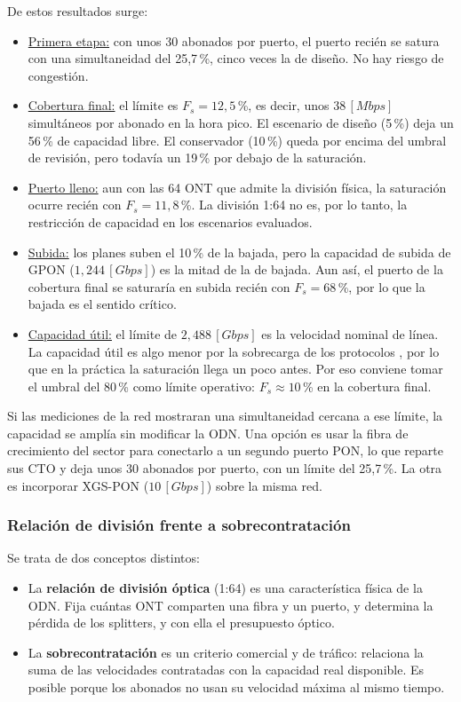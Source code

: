 De estos resultados surge:
\begin{itemize}
    \item \underline{Primera etapa:} con unos 30 abonados por puerto, el puerto recién se satura con una simultaneidad del 25,7\,\%, cinco veces la de diseño. No hay riesgo de congestión.
    \item \underline{Cobertura final:} el límite es $F_s = 12{,}5$\,\%, es decir, unos $38 \, [Mbps]$ simultáneos por abonado en la hora pico. El escenario de diseño (5\,\%) deja un 56\,\% de capacidad libre. El conservador (10\,\%) queda por encima del umbral de revisión, pero todavía un 19\,\% por debajo de la saturación.
    \item \underline{Puerto lleno:} aun con las 64 ONT que admite la división física, la saturación ocurre recién con $F_s = 11{,}8$\,\%. La división 1:64 no es, por lo tanto, la restricción de capacidad en los escenarios evaluados.
    \item \underline{Subida:} los planes suben el 10\,\% de la bajada, pero la capacidad de subida de GPON ($1{,}244 \, [Gbps]$) es la mitad de la de bajada. Aun así, el puerto de la cobertura final se saturaría en subida recién con $F_s = 68$\,\%, por lo que la bajada es el sentido crítico.
    \item \underline{Capacidad útil:} el límite de $2{,}488 \, [Gbps]$ es la velocidad nominal de línea. La capacidad útil es algo menor por la sobrecarga de los protocolos \cite{doc_backhaul}, por lo que en la práctica la saturación llega un poco antes. Por eso conviene tomar el umbral del 80\,\% como límite operativo: $F_s \approx 10$\,\% en la cobertura final.
\end{itemize}
Si las mediciones de la red mostraran una simultaneidad cercana a ese límite, la capacidad se amplía sin modificar la ODN. Una opción es usar la fibra de crecimiento del sector para conectarlo a un segundo puerto PON, lo que reparte sus CTO y deja unos 30 abonados por puerto, con un límite del 25,7\,\%. La otra es incorporar XGS-PON ($10 \, [Gbps]$) sobre la misma red.

\subsubsection{Relación de división frente a sobrecontratación}
Se trata de dos conceptos distintos:
\begin{itemize}
    \item La \textbf{relación de división óptica} (1:64) es una característica física de la ODN. Fija cuántas ONT comparten una fibra y un puerto, y determina la pérdida de los splitters, y con ella el presupuesto óptico.
    \item La \textbf{sobrecontratación} es un criterio comercial y de tráfico: relaciona la suma de las velocidades contratadas con la capacidad real disponible. Es posible porque los abonados no usan su velocidad máxima al mismo tiempo.
\end{itemize}

